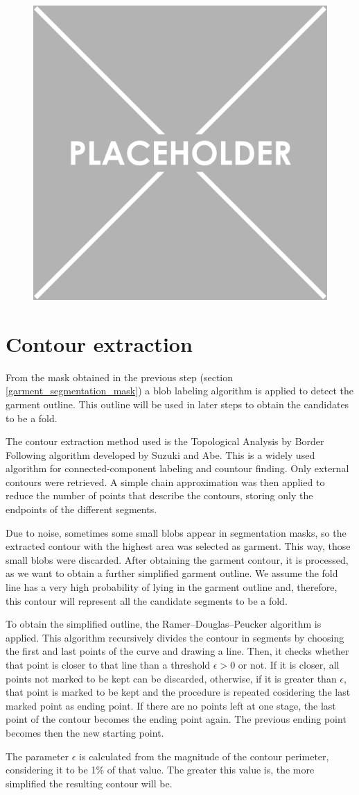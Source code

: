 \begin{figure}[thpb]
    \centering
    \includegraphics[width=0.48
    \textwidth]{figures/placeholder.png}
    \caption{}
    \label{fig:segmentation_mask}
\end{figure}

\section{Contour extraction}
From the mask obtained in the previous step (section \ref{garment_segmentation_mask}) a blob labeling algorithm is applied to detect the garment outline. This outline will be used in later steps to obtain the candidates to be a fold.

The contour extraction method used is the Topological Analysis by Border Following algorithm developed by Suzuki and Abe. This is a widely used algorithm for connected-component labeling and countour finding. Only external contours were retrieved. A simple chain approximation was then applied to reduce the number of points that describe the contours, storing only the endpoints of the different segments.

Due to noise, sometimes some small blobs appear in segmentation masks, so the extracted contour with the highest area was selected as garment. This way, those small blobs were discarded.
After obtaining the garment contour, it is processed, as we want to obtain a further simplified garment outline. We assume the fold line has a very high probability of lying in the garment outline and, therefore, this contour will represent all the candidate segments to be a fold. 

To obtain the simplified outline, the Ramer–Douglas–Peucker algorithm  is applied. This algorithm recursively divides the contour in segments by choosing the first and last points of the curve and drawing a line. Then, it checks whether that point is closer to that line than a threshold $\epsilon > 0$ or not. If it is closer, all points not marked to be kept can be discarded, otherwise, if it is greater than $\epsilon$, that point is marked to be kept and the procedure is repeated cosidering the last marked point as ending point. If there are no points left at one stage, the last point of the contour becomes the ending point again. The previous ending point becomes then the new starting point.

The parameter $\epsilon$ is calculated from the magnitude of the contour perimeter, considering it to be 1\% of that value. The greater this value is, the more simplified the resulting contour will be.